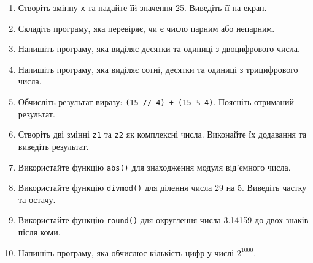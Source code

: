 	\begin{enumerate}
		\item Створіть змінну \texttt{x} та надайте їй значення 25. Виведіть її на екран.
		\item Складіть програму, яка перевіряє, чи є число парним або непарним.
		\item Напишіть програму, яка виділяє десятки та одиниці з двоцифрового числа.
		\item Напишіть програму, яка виділяє сотні, десятки та одиниці з трицифрового числа.
		\item Обчисліть результат виразу: \texttt{(15 // 4) + (15 \% 4)}. Поясніть отриманий результат.
		\item Створіть дві змінні \texttt{z1} та \texttt{z2} як комплексні числа. Виконайте їх додавання та виведіть результат.
		\item Використайте функцію \texttt{abs()} для знаходження модуля від’ємного числа.
		\item Використайте функцію \texttt{divmod()} для ділення числа 29 на 5. Виведіть частку та остачу.
		\item Використайте функцію \texttt{round()} для округлення числа 3.14159 до двох знаків після коми.
		\item Напишіть програму, яка обчислює кількість цифр у числі $2^{1000}$.
	\end{enumerate}
	

	
	